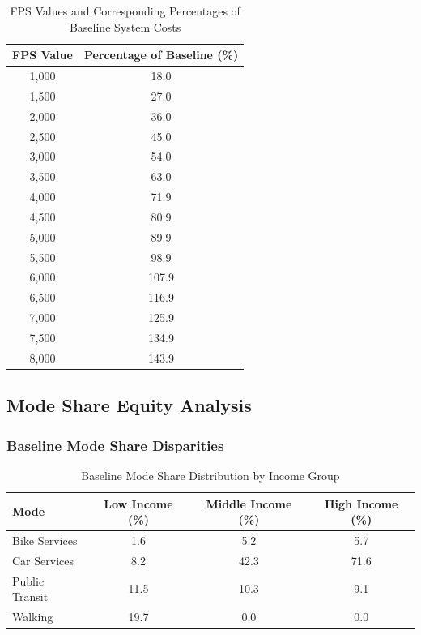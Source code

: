 \documentclass[a4paper,fleqn]{cas-sc}
\begin{document}
\begin{table}[!ht]
\centering
\caption{FPS Values and Corresponding Percentages of Baseline System Costs}
\label{tab:fps_baseline}
\begin{tabular}{cc}
\hline
\textbf{FPS Value} & \textbf{Percentage of Baseline (\%)} \\
\hline
1,000 & 18.0 \\
1,500 & 27.0 \\
2,000 & 36.0 \\
2,500 & 45.0 \\
3,000 & 54.0 \\
3,500 & 63.0 \\
4,000 & 71.9 \\
4,500 & 80.9 \\
5,000 & 89.9 \\
5,500 & 98.9 \\
6,000 & 107.9 \\
6,500 & 116.9 \\
7,000 & 125.9 \\
7,500 & 134.9 \\
8,000 & 143.9 \\
\hline
\end{tabular}
\end{table}

\subsection{Mode Share Equity Analysis}
\subsubsection{Baseline Mode Share Disparities}

\begin{table}[!t]
\centering
\caption{Baseline Mode Share Distribution by Income Group}
\label{tab:baseline_mode_share}
\begin{tabular}{lccc}
\hline
\textbf{Mode} & \textbf{Low Income (\%)} & \textbf{Middle Income (\%)} & \textbf{High Income (\%)} \\
\hline
Bike Services & 1.6 & 5.2 & 5.7 \\
Car Services & 8.2 & 42.3 & 71.6 \\
Public Transit & 11.5 & 10.3 & 9.1 \\
Walking & 19.7 & 0.0 & 0.0 \\
\hline
\end{tabular}
\end{table}
\end{document}

